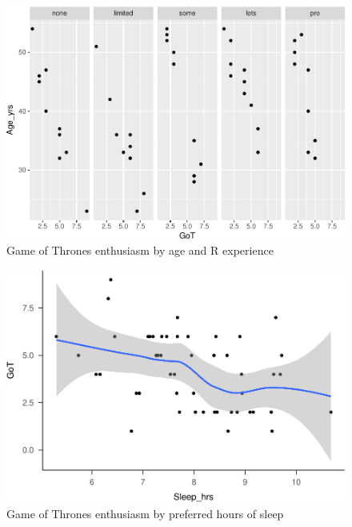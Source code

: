 \documentclass[english,man]{apa6}
\theoremstyle{definition}
\theoremstyle{definition}
\theoremstyle{remark}
\begin{document}
\begin{figure}[htbp]
\centering
\includegraphics{gilmore-lebreton-hallquist_files/figure-latex/GoT-by-age-exp-1.pdf}
\caption{\label{fig:GoT-by-age-exp}Game of Thrones enthusiasm by age and R
experience}
\end{figure}

\begin{figure}[htbp]
\centering
\includegraphics{gilmore-lebreton-hallquist_files/figure-latex/GoT-by-sleep-1.pdf}
\caption{\label{fig:GoT-by-sleep}Game of Thrones enthusiasm by preferred
hours of sleep}
\end{figure}
\end{document}
